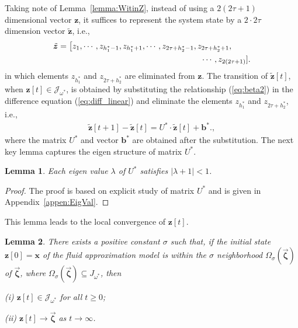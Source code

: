 \documentclass[11pt,twocolumn]{IEEEtran}
\newtheorem{lemma}{Lemma}
\begin{document}
Taking note of Lemma~\ref{lemma:WitinZ}, instead of using a $2(2\tau+1)$ dimensional vector $\bm z$, it suffices to represent the system state by a $2 \cdot 2\tau$ dimension vector $\tilde{\bm z}$, i.e.,
\begin{align}
&\tilde{\bm z}=\big[z_1, \cdots, z_{h_1^*-1}, z_{h_1^*+1}, \cdots, z_{2\tau+h_2^*-1}, z_{2\tau+h_2^*+1},\nonumber\\
&\hspace{2.5in} \cdots, z_{2(2\tau+1)}]. \nonumber
\end{align}
in which elements $z_{h_1^*}$ and $z_{2\tau+h_2^*}$ are eliminated from $\bm z$. The transition of $ \tilde{\bm z}[t]$, when $\bm z[t] \in \mathcal{J}_{\omega^*}$, is obtained by substituting the relationship (\ref{eq:beta2}) in the difference equation (\ref{eq:diff_linear}) and eliminate the elements $z_{h_1^*}$ and $z_{2\tau+h_2^*}$, i.e.,
\begin{align}
\tilde{\bm z}[t+1]-\tilde{\bm z}[t]= U^* \cdot \tilde{\bm z}[t] + \bm b^*. \label{eq:Q_tilde},
\end{align}
where the matrix $U^*$ and vector $\bm b^*$ are obtained after the substitution.
The next key lemma captures the eigen structure of matrix $U^*$.

\begin{lemma}
\label{lemma:EigVal}
Each eigen value $\lambda$ of $U^*$ satisfies $\big|\lambda+1\big|<1$.
\end{lemma}

\begin{proof}
The proof is based on explicit study of matrix $U^*$ and is given in Appendix~\ref{appen:EigVal}.
\end{proof}
\vspace{4pt}

This lemma leads to the local convergence of $\bm z[t]$.

\begin{lemma}
\label{prof:fluid_conv}
There exists a positive constant $\sigma$ such that, if the initial state $\bm z[0]=\bm x$ of the fluid approximation model is within the $\sigma$ neighborhood $\Omega_{\sigma}(\vec{\bm \zeta})$ of $\vec{\bm \zeta}$, where $\Omega_{\sigma}(\vec{\bm \zeta}) \subseteq J_{\omega^*}$, then
\vspace{4pt}

(i) $\bm z[t] \in \mathcal{J}_{\omega^*}$ for all $t\geq0$;

(ii) $\bm z[t] \rightarrow \vec{\bm \zeta}$ as $t \rightarrow \infty$.
\end{lemma}
\end{document}
